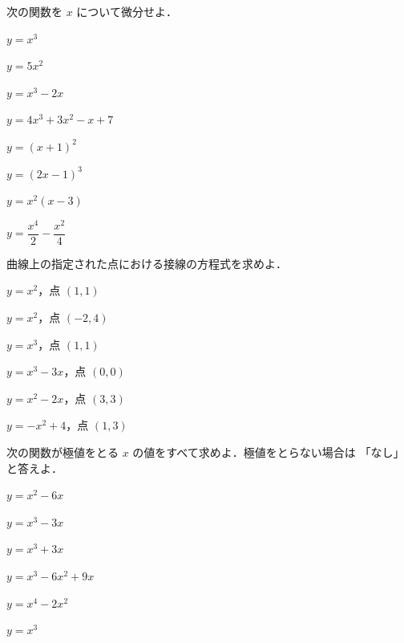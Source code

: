 \documentclass[lualatex,paper=b5j,fontsize=10pt,twoside]{jlreq}
\begin{document}
\MakeMathMagazineTitle


次の関数を $x$ について微分せよ．

\begin{msdrill}
  \item $y=x^3$
  \item $y=5x^2$
  \item $y=x^3-2x$
  \item $y=4x^3+3x^2-x+7$
  \item $y=(x+1)^2$
  \item $y=(2x-1)^3$
  \item $y=x^2(x-3)$
  \item $y=\dfrac{x^4}{2}-\dfrac{x^2}{4}$
\end{msdrill}

\begin{msanswerstrip}
\end{msanswerstrip}


曲線上の指定された点における接線の方程式を求めよ．

\begin{msdrill}
  \item $y=x^2$，点 $(1,1)$
  \item $y=x^2$，点 $(-2,4)$
  \item $y=x^3$，点 $(1,1)$
  \item $y=x^3-3x$，点 $(0,0)$
  \item $y=x^2-2x$，点 $(3,3)$
  \item $y=-x^2+4$，点 $(1,3)$
\end{msdrill}

\begin{msanswerstrip}
\end{msanswerstrip}


次の関数が極値をとる $x$ の値をすべて求めよ．極値をとらない場合は
「なし」と答えよ．

\begin{msdrill}
  \item $y=x^2-6x$
  \item $y=x^3-3x$
  \item $y=x^3+3x$
  \item $y=x^3-6x^2+9x$
  \item $y=x^4-2x^2$
  \item $y=x^3$
\end{msdrill}
\end{document}
